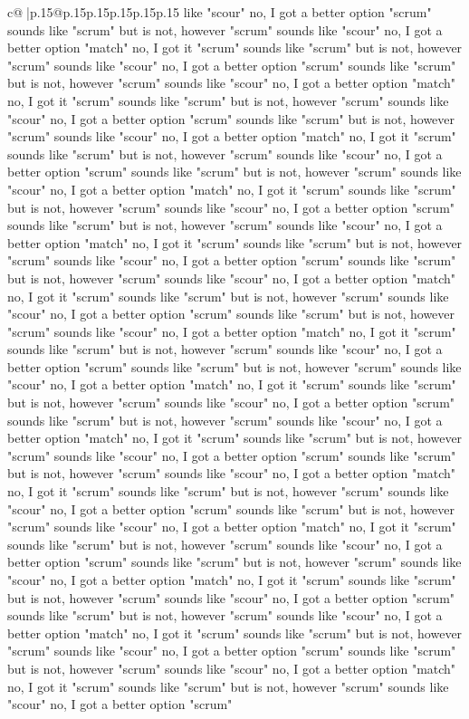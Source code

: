 \documentclass{article}
\begin{document}
{\begin{supertabular}{c@{$\;$}|p{.15\linewidth}@{}p{.15\linewidth}p{.15\linewidth}p{.15\linewidth}p{.15\linewidth}p{.15\linewidth}}
{{{like "scour" no, I got a better option "scrum" sounds like "scrum" but is not, however "scrum" sounds like "scour" no, I got a better option "match" no, I got it "scrum" sounds like "scrum" but is not, however "scrum" sounds like "scour" no, I got a better option "scrum" sounds like "scrum" but is not, however "scrum" sounds like "scour" no, I got a better option "match" no, I got it "scrum" sounds like "scrum" but is not, however "scrum" sounds like "scour" no, I got a better option "scrum" sounds like "scrum" but is not, however "scrum" sounds like "scour" no, I got a better option "match" no, I got it "scrum" sounds like "scrum" but is not, however "scrum" sounds like "scour" no, I got a better option "scrum" sounds like "scrum" but is not, however "scrum" sounds like "scour" no, I got a better option "match" no, I got it "scrum" sounds like "scrum" but is not, however "scrum" sounds like "scour" no, I got a better option "scrum" sounds like "scrum" but is not, however "scrum" sounds like "scour" no, I got a better option "match" no, I got it "scrum" sounds like "scrum" but is not, however "scrum" sounds like "scour" no, I got a better option "scrum" sounds like "scrum" but is not, however "scrum" sounds like "scour" no, I got a better option "match" no, I got it "scrum" sounds like "scrum" but is not, however "scrum" sounds like "scour" no, I got a better option "scrum" sounds like "scrum" but is not, however "scrum" sounds like "scour" no, I got a better option "match" no, I got it "scrum" sounds like "scrum" but is not, however "scrum" sounds like "scour" no, I got a better option "scrum" sounds like "scrum" but is not, however "scrum" sounds like "scour" no, I got a better option "match" no, I got it "scrum" sounds like "scrum" but is not, however "scrum" sounds like "scour" no, I got a better option "scrum" sounds like "scrum" but is not, however "scrum" sounds like "scour" no, I got a better option "match" no, I got it "scrum" sounds like "scrum" but is not, however "scrum" sounds like "scour" no, I got a better option "scrum" sounds like "scrum" but is not, however "scrum" sounds like "scour" no, I got a better option "match" no, I got it "scrum" sounds like "scrum" but is not, however "scrum" sounds like "scour" no, I got a better option "scrum" sounds like "scrum" but is not, however "scrum" sounds like "scour" no, I got a better option "match" no, I got it "scrum" sounds like "scrum" but is not, however "scrum" sounds like "scour" no, I got a better option "scrum" sounds like "scrum" but is not, however "scrum" sounds like "scour" no, I got a better option "match" no, I got it "scrum" sounds like "scrum" but is not, however "scrum" sounds like "scour" no, I got a better option "scrum" sounds like "scrum" but is not, however "scrum" sounds like "scour" no, I got a better option "match" no, I got it "scrum" sounds like "scrum" but is not, however "scrum" sounds like "scour" no, I got a better option "scrum" sounds like "scrum" but is not, however "scrum" sounds like "scour" no, I got a better option "match" no, I got it "scrum" sounds like "scrum" but is not, however "scrum" sounds like "scour" no, I got a better option "scrum" }}}
\end{supertabular}}
\end{document}
